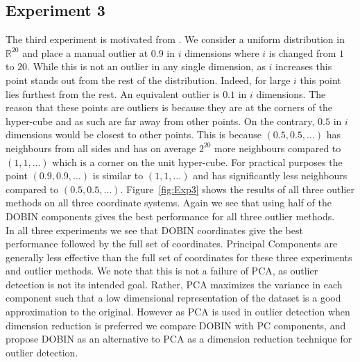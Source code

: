 \documentclass[a4paper,11pt]{article}
\begin{document}
\subsection{Experiment 3}
The third experiment is motivated from \cite{zimek2012survey}. We consider a uniform distribution in $\mathbb{R}^{20}$ and place a manual outlier at $0.9$ in $i$ dimensions where $i$ is changed from $1$ to $20$. While this is not an outlier in any single dimension, as $i$ increases this point stands out from the rest of the distribution. Indeed, for large $i$ this  point lies furthest from the rest. An equivalent outlier is $0.1$ in $i$ dimensions. The reason that these points are outliers is because they are at the corners of the hyper-cube and as such are far away from other points. On the contrary, $0.5$ in $i$ dimensions would be closest to other points. This is because $(0.5, 0.5, \ldots)$ has neighbours from all sides and has on average $2^{20}$ more neighbours compared to $(1, 1, \ldots)$  which is a corner on the unit hyper-cube. For practical purposes the point $(0.9, 0.9, \ldots)$ is similar to $(1, 1, \ldots)$ and has significantly less neighbours compared to $(0.5, 0.5, \ldots)$. Figure~\ref{fig:Exp3} shows the results of all three outlier methods on all three coordinate systems. Again we see that using half of the DOBIN components gives the best performance for all three outlier methods.    \\

In all three experiments we see that DOBIN coordinates give the best performance followed by the full set of coordinates. Principal Components are generally less effective than the full set of coordinates for these three experiments and outlier methods. We note that this is not a failure of PCA, as outlier detection is not its intended goal. Rather, PCA maximizes the variance in each component such that a low dimensional representation of the dataset is a good approximation to the original. However as PCA is used in outlier detection when dimension reduction is preferred we compare DOBIN with PC components, and propose DOBIN as an alternative to PCA as a dimension reduction technique for outlier detection. %
\end{document}
